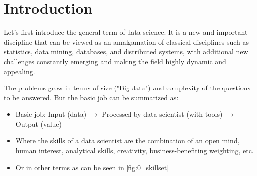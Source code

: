 \section*{Introduction}
\setcounter{figure}{0}

Let's first introduce the general term of data science. It is a new and important discipline that can be viewed as an amalgamation of classical disciplines such as statistics, data mining, databases, and distributed systems, with additional new challenges constantly emerging and making the field highly dynamic and appealing.

The problems grow in terms of size ("Big data") and complexity of the questions to be answered. But the basic job can be summarized as:
\begin{itemize}
  \item Basic job: Input (data) $\rightarrow$ Processed by data scientist (with tools) $\rightarrow$ Output (value)
  \item Where the skills of a data scientist are the combination of an open mind, human interest, analytical skills, creativity, business-benefiting weighting, etc.
  \item Or in other terms as can be seen in \ref{fig:0_skillset}
\end{itemize}

